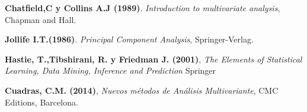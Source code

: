 
\begin{thebibliography}{99}
	

 \textbf{Chatfield,C y Collins A.J (1989)}. {\em Introduction to multivariate analysis}, Chapman and Hall.

 \textbf{Jollife I.T.(1986)}. {\em Principal Component Analysis}, Springer-Verlag.

 \textbf{Hastie, T.,Tibshirani, R. y Friedman J. (2001)}, \textit{The Elements of Statistical Learning, Data Mining, Inference and Prediction} Springer 

 \textbf{Cuadras, C.M. (2014)}, \textit{Nuevos métodos de Análisis Multivariante}, CMC Editions, Barcelona. 
            
          
        
\end{thebibliography}
